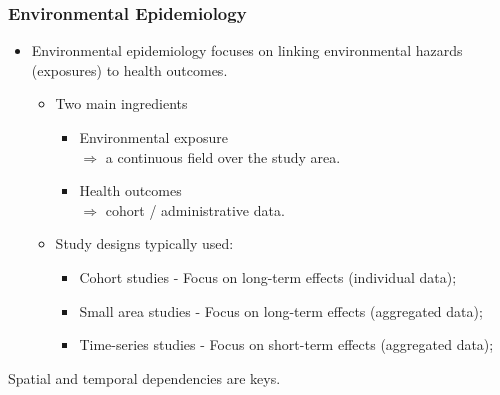\documentclass[slidestop,compress,serif,10pt]{beamer}
\begin{document}
\begin{frame}\frametitle{Environmental Epidemiology}
\begin{itemize}
\vfill\item Environmental epidemiology focuses on linking environmental hazards (exposures) to health outcomes. 
\begin{itemize}
\vfill\item Two main ingredients
\begin{itemize}
\item Environmental exposure\\
$\Rightarrow$ a continuous field over the study area.
\item Health outcomes\\
$\Rightarrow$ cohort / administrative data.
\end{itemize}
\pause\vspace{5pt}\item<1-> Study designs typically used:
\begin{itemize}
\vspace{5pt}\item<1-> Cohort studies - Focus on long-term effects (individual data);\vspace{3pt}
\vspace{5pt}\item<1-> Small area studies - Focus on long-term effects (aggregated data);\vspace{3pt}
\vspace{5pt}\item<1-> Time-series studies - Focus on short-term effects (aggregated data);\vspace{3pt}
\end{itemize}
\end{itemize}
\pause{}

\end{itemize}
\alert{Spatial and temporal dependencies are keys.}
\end{frame}
\end{document}
